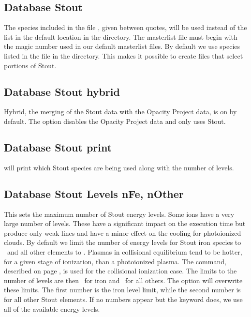 \subsection{Database Stout }
The species included in the file , given between quotes, will be used
instead of the list in the default location in the  directory.
The masterlist file must begin with the magic number used in our default masterlist files.
By default we use species listed in the  file in the 
 directory.
This makes it possible to create  files that select portions of Stout.

\subsection{Database Stout hybrid} 
Hybrid, the merging of the Stout data with the Opacity Project data, 
is on by default.
The  option disables the Opacity Project data 
and only uses Stout.

\subsection{Database Stout print} 
will print which Stout species are being used
along with the number of levels.

\subsection{Database Stout Levels nFe, nOther} 
This sets the maximum number of Stout energy levels. 
Some ions have a very large number of levels.
These have a significant impact
on the execution time but produce only weak lines and have a minor effect
on the cooling for photoionized clouds.
By default we limit the number of energy levels for Stout iron species to 
\nDefaultPhotoLevelsFe\ and all other elements to \nDefaultPhotoLevels.
Plasmas in collisional equilibrium tend to be hotter, for a given
stage of ionization, than a photoionized plasma.  
The  command, described on
page \pageref{sec:CommandCoronalEquilibrium}, is used for
the collisional ionization case.
The limits to the number of levels are then \nDefaultCollLevelsFe\ for iron 
and \nDefaultCollLevels\ for all others.
The  option will overwrite these limits.
The first number is the iron level limit, while the second number 
is for all other Stout elements.
If no numbers appear but the keyword  does, we use all 
of the available energy levels.

